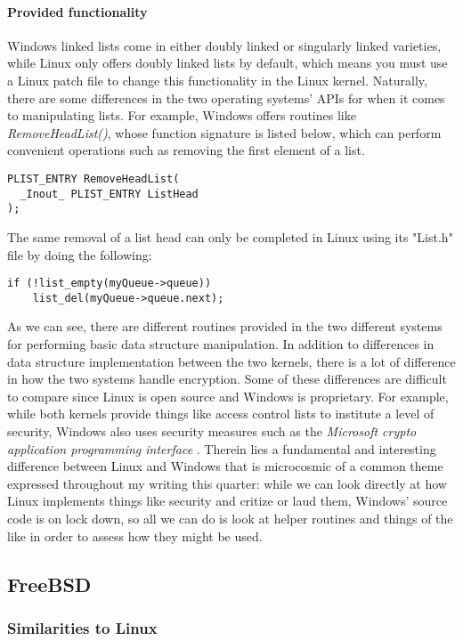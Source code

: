 \documentclass[letterpaper,10pt,titlepage]{article}
\begin{document}
\paragraph{Provided functionality}
Windows linked lists come in either doubly linked or singularly linked varieties, while Linux only offers doubly linked lists by default, which means you must use a Linux patch file to change this functionality in the Linux kernel. Naturally, there are some differences in the two operating systems' APIs for when it comes to manipulating lists. For example, Windows offers routines like \emph{RemoveHeadList()}, whose function signature is listed below, which can perform convenient operations such as removing the first element of a list. 
\begin{lstlisting}
PLIST_ENTRY RemoveHeadList(
  _Inout_ PLIST_ENTRY ListHead
);
\end{lstlisting}
The same removal of a list head can only be completed in Linux using its "List.h" file by doing the following:
\begin{lstlisting}
if (!list_empty(myQueue->queue))
    list_del(myQueue->queue.next);
\end{lstlisting}
As we can see, there are different routines provided in the two different systems for performing basic data structure manipulation. In addition to differences in data structure implementation between the two kernels, there is a lot of difference in how the two systems handle encryption. Some of these differences are difficult to compare since Linux is open source and Windows is proprietary. For example, while both kernels provide things like access control lists to institute a level of security, Windows also uses security measures such as the \emph{Microsoft crypto application programming interface} \cite{windows3}. Therein lies a fundamental and interesting difference between Linux and Windows that is microcosmic of a common theme expressed throughout my writing this quarter: while we can look directly at how Linux implements things like security and critize or laud them, Windows' source code is on lock down, so all we can do is look at helper routines and things of the like in order to assess how they might be used.  


\subsection{FreeBSD}

% 
%
%
\subsubsection{Similarities to Linux}
\end{document}
